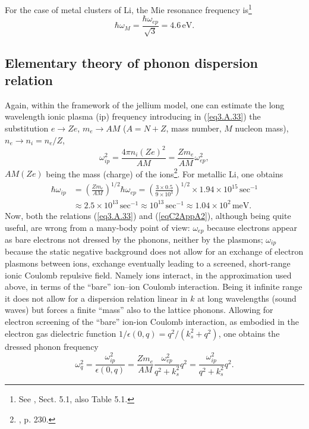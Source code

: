 For the case of metal clusters of Li, the Mie resonance frequency is\footnote{See \cite{Bertsch:05}, Sect. 5.1, also Table 5.1.}
\begin{equation}
\hbar\omega_M=\frac{\hbar\omega_{ep}}{\sqrt{3}}=4.6\,\text{eV}.
\end{equation}
\subsection{Elementary theory of phonon dispersion relation}\label{App3A3}
Again, within the framework of the jellium model, one can estimate the long wavelength ionic plasma (ip) frequency introducing in (\ref{eq3.A.33})  the substitution $e\rightarrow Ze$, $m_e\rightarrow AM$ ($A=N+Z$, mass number, $M$ nucleon mass), $n_e\rightarrow n_i=n_e/Z$,
\begin{equation}\label{eqC2AppA2}
\omega_{ip}^2=\frac{4\pi n_i(Ze)^2}{AM}=\frac{Zm_e}{AM}\omega_{ep}^2,
\end{equation}
$AM (Ze)$ being the mass (charge) of the ions\footnote{\cite{Ketterson:99}, p. 230.}.
For metallic Li, one obtains
\begin{align}
\nonumber\hbar\omega_{ip}&=\left(\frac{Zm_e}{AM}\right)^{1/2}\hbar\omega_{ep}=\left(\frac{3\times0.5}{9\times10^3}\right)^{1/2}\times1.94\times 10^{15}\,\text{sec}^{-1}\\
&\approx2.5\times10^{13}\,\text{sec}^{-1}\approx10^{13}\,\text{sec}^{-1}\approx1.04\times10^2\,\text{meV}.
\end{align}
Now, both  the  relations (\ref{eq3.A.33}) and (\ref{eqC2AppA2}), although being quite useful, are wrong from a many-body point of view: $\omega_{ep}$ because electrons appear as bare electrons not dressed by the phonons, neither by the plasmons; $\omega_{ip}$ because the  static negative background does not allow for an exchange of electron plasmons between ions, exchange eventually leading to a screened, short-range ionic Coulomb repulsive field. Namely ions interact, in the approximation used above, in terms of the ``bare'' ion--ion Coulomb interaction. Being it infinite range it does not allow for a dispersion relation linear in $k$ at long wavelengths (sound waves) but forces a finite ``mass'' also to the lattice phonons. Allowing for electron screening of the ``bare'' ion-ion Coulomb interaction, as embodied in the electron gas dielectric function $1/\epsilon(0,q)=q^2/(k_s^2+q^2)$, one obtains the dressed phonon frequency
\begin{equation}\label{eqC2AppA3}
\omega_q^2=\frac{\omega_{ip}^2}{\epsilon(0,q)}=\frac{Zm_e}{AM}\frac{\omega_{ep}^2}{q^2+k_s^2}q^2=\frac{\omega_{ip}^2}{q^2+k_s^2}q^2.
\end{equation}
